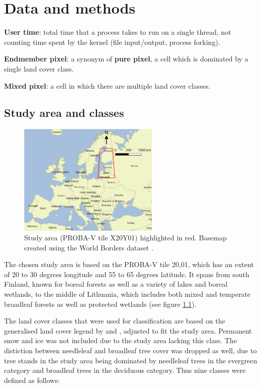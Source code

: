 \documentclass[a4paper,12pt]{scrbook}
\begin{document}
\chapter{Data and methods}

\textbf{User time}: total time that a process takes to run on a single thread, not counting time spent by the kernel (file input/output, process forking).

\textbf{Endmember pixel}: a synonym of \textbf{pure pixel}, a cell which is dominated by a single land cover class.

\textbf{Mixed pixel}: a cell in which there are multiple land cover classes.

\section{Study area and classes}

\begin{figure}
 \centering
 \includegraphics[width=0.6\textwidth]{./thesis-figures/aoi}
 \caption{Study area (PROBA-V tile X20Y01) highlighted in red. Basemap created using the World Borders dataset \citep{worldborders}.}
 \label{AOI}
\end{figure} 

The chosen study area is based on the PROBA-V tile 20,01, which has an extent of 20 to 30 degrees longitude and 55 to 65 degrees latitude. It spans from south Finland, known for boreal forests as well as a variety of lakes and boreal wetlands, to the middle of Lithuania, which includes both mixed and temperate broadleaf forests as well as protected wetlands (see figure \ref{AOI}).

The land cover classes that were used for classification are based on the generalised land cover legend by \citet{see2015hybrid} and \citet{Herold2008lccomparison}, adjusted to fit the study area. Permanent snow and ice was not included due to the study area lacking this class. The distiction between needleleaf and broadleaf tree cover was dropped as well, due to tree stands in the study area being dominated by needleleaf trees in the evergreen category and broadleaf trees in the deciduous category. Thus nine classes were defined as follows:
\end{document}
